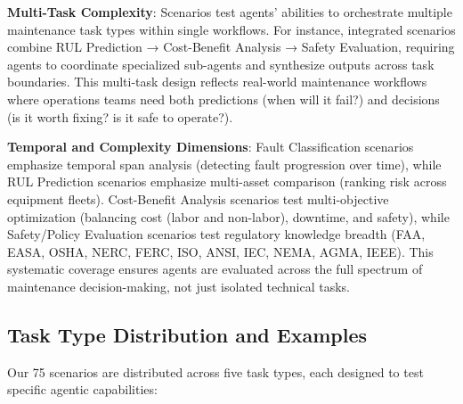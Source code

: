 \documentclass[conference]{IEEEtran}
\begin{document}
\textbf{Multi-Task Complexity}: Scenarios test agents' abilities to orchestrate multiple maintenance task types within single workflows. For instance, integrated scenarios combine RUL Prediction → Cost-Benefit Analysis → Safety Evaluation, requiring agents to coordinate specialized sub-agents and synthesize outputs across task boundaries. This multi-task design reflects real-world maintenance workflows where operations teams need both predictions (when will it fail?) and decisions (is it worth fixing? is it safe to operate?).

\textbf{Temporal and Complexity Dimensions}: Fault Classification scenarios emphasize temporal span analysis (detecting fault progression over time), while RUL Prediction scenarios emphasize multi-asset comparison (ranking risk across equipment fleets). Cost-Benefit Analysis scenarios test multi-objective optimization (balancing cost (labor and non-labor), downtime, and safety), while Safety/Policy Evaluation scenarios test regulatory knowledge breadth (FAA, EASA, OSHA, NERC, FERC, ISO, ANSI, IEC, NEMA, AGMA, IEEE). This systematic coverage ensures agents are evaluated across the full spectrum of maintenance decision-making, not just isolated technical tasks.

\subsection{Task Type Distribution and Examples}

Our 75 scenarios are distributed across five task types, each designed to test specific agentic capabilities:
\end{document}
